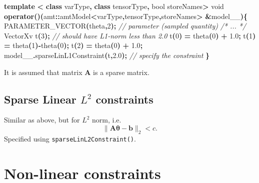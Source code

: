 \documentclass[
]{book}
\newenvironment{Shaded}{\begin{snugshade}}{\end{snugshade}}
\newcommand{\CommentTok}[1]{\textcolor[rgb]{0.56,0.35,0.01}{\textit{#1}}}
\newcommand{\DataTypeTok}[1]{\textcolor[rgb]{0.13,0.29,0.53}{#1}}
\newcommand{\DecValTok}[1]{\textcolor[rgb]{0.00,0.00,0.81}{#1}}
\newcommand{\FloatTok}[1]{\textcolor[rgb]{0.00,0.00,0.81}{#1}}
\newcommand{\KeywordTok}[1]{\textcolor[rgb]{0.13,0.29,0.53}{\textbf{#1}}}
\newcommand{\NormalTok}[1]{#1}
\newcommand{\OperatorTok}[1]{\textcolor[rgb]{0.81,0.36,0.00}{\textbf{#1}}}
\begin{document}
\begin{Shaded}
\begin{Highlighting}[]
\KeywordTok{template} \OperatorTok{\textless{}} \KeywordTok{class}\NormalTok{ varType}\OperatorTok{,} \KeywordTok{class}\NormalTok{ tensorType}\OperatorTok{,} \DataTypeTok{bool}\NormalTok{ storeNames}\OperatorTok{\textgreater{}}
  \DataTypeTok{void} \KeywordTok{operator}\OperatorTok{()(}\NormalTok{amt}\OperatorTok{::}\NormalTok{amtModel}\OperatorTok{\textless{}}\NormalTok{varType}\OperatorTok{,}\NormalTok{tensorType}\OperatorTok{,}\NormalTok{storeNames}\OperatorTok{\textgreater{}} \OperatorTok{\&}\NormalTok{model\_\_}\OperatorTok{)\{}
\NormalTok{    PARAMETER\_VECTOR}\OperatorTok{(}\NormalTok{theta}\OperatorTok{,}\DecValTok{2}\OperatorTok{);} \CommentTok{// parameter (sampled quantity)}
    \CommentTok{/* ... */}
\NormalTok{    VectorXv t}\OperatorTok{(}\DecValTok{3}\OperatorTok{);} \CommentTok{// should have L1{-}norm less than 2.0}
\NormalTok{    t}\OperatorTok{(}\DecValTok{0}\OperatorTok{)} \OperatorTok{=}\NormalTok{ theta}\OperatorTok{(}\DecValTok{0}\OperatorTok{)} \OperatorTok{+} \FloatTok{1.0}\OperatorTok{;} 
\NormalTok{    t}\OperatorTok{(}\DecValTok{1}\OperatorTok{)} \OperatorTok{=}\NormalTok{ theta}\OperatorTok{(}\DecValTok{1}\OperatorTok{){-}}\NormalTok{theta}\OperatorTok{(}\DecValTok{0}\OperatorTok{);}
\NormalTok{    t}\OperatorTok{(}\DecValTok{2}\OperatorTok{)} \OperatorTok{=}\NormalTok{ theta}\OperatorTok{(}\DecValTok{0}\OperatorTok{)} \OperatorTok{+} \FloatTok{1.0}\OperatorTok{;}
\NormalTok{    model\_\_}\OperatorTok{.}\NormalTok{sparseLinL1Constraint}\OperatorTok{(}\NormalTok{t}\OperatorTok{,}\FloatTok{2.0}\OperatorTok{);} \CommentTok{// specify the constraint}
  \OperatorTok{\}}
\end{Highlighting}
\end{Shaded}

It is assumed that matrix \(\mathbf A\) is a sparse matrix.

\hypertarget{sparse-linear-l2-constraints}{%
\subsection{\texorpdfstring{Sparse Linear \(L^2\) constraints}{Sparse Linear L\^{}2 constraints}}\label{sparse-linear-l2-constraints}}

Similar as above, but for \(L^2\) norm, i.e.~
\[
\parallel \mathbf A \boldsymbol \theta - \mathbf b \parallel_2 < c.
\]
Specified using \texttt{sparseLinL2Constraint()}.

\hypertarget{non-linear-constraints}{%
\section{Non-linear constraints}\label{non-linear-constraints}}
\end{document}
